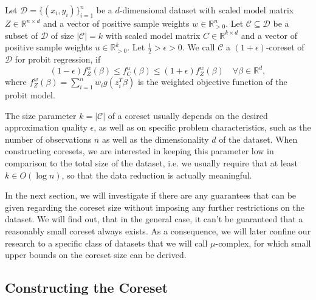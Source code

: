 \begin{definition}[Coreset]
    \label{def:coreset}
    Let $\mathcal{D}=\{(x_i, y_i)\}_{i=1}^n$ be a $d$-dimensional dataset
    with scaled model matrix $Z \in \mathbb{R}^{n \times d}$ and
    a vector of positive sample weights $w \in \mathbb{R}_{>0}^n$.
    Let $\mathcal{C} \subseteq \mathcal{D}$ be a subset of $\mathcal{D}$
    of size $|\mathcal{C}| = k$
    with scaled model matrix $C \in \mathbb{R}^{k \times d}$ and
    a vector of positive sample weights $u \in \mathbb{R}_{>0}^k$.
    Let $\frac{1}{2} > \epsilon > 0$.
    We call $\mathcal{C}$ a $(1+\epsilon)$-coreset of $\mathcal{D}$
    for probit regression, if
    \begin{equation*}
        (1-\epsilon)f_Z^w(\beta) \leq f_C^u(\beta) \leq (1+\epsilon)f_Z^w(\beta)
        \quad \forall \beta \in \mathbb{R}^d,
    \end{equation*}
    where $f_Z^w(\beta) = \sum_{i=1}^n w_i g(z_i^T \beta)$ is the
    weighted objective function of the probit model.
\end{definition}

The size parameter $k = |\mathcal{C}|$ of a coreset usually depends
on the desired approximation quality $\epsilon$, as well as on
specific problem characteristics, such as the number of observations
$n$ as well as the dimensionality $d$ of the dataset.
When constructing coresets, we are interested in keeping this parameter
low in comparison to the total size of the dataset, i.e. we
usually require that at least $k \in O(\log{n})$, so that
the data reduction is actually meaningful.

In the next section, we will investigate if there are any
guarantees that can be given regarding the coreset size
without imposing any further restrictions on the dataset.
We will find out, that in the general case, it can't
be guaranteed that a reasonably small coreset always exists.
As a consequence, we will later confine our research to a
specific class of datasets that we will call $\mu$-complex,
for which small upper bounds on the coreset size can be
derived.





\subsection{Constructing the Coreset}



